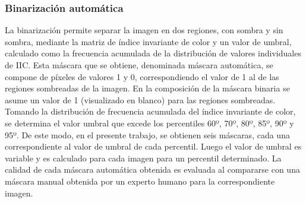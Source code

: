 \subsubsection{Binarización automática}
 La binarización permite separar la imagen en dos regiones, con sombra y sin sombra, mediante la matriz de índice invariante de color y un valor de umbral, calculado como la frecuencia acumulada de la distribución de valores individuales de IIC. Esta máscara que se obtiene, denominada máscara automática, se compone de píxeles de valores 1 y 0, correspondiendo el valor de 1 al de las regiones sombreadas de la imagen. En la composición de la máscara binaria se asume un valor de 1 (visualizado en blanco) para las regiones sombreadas. Tomando la distribución de frecuencia acumulada del índice invariante de color, se determina el valor umbral que excede los percentiles 60º, 70º, 80º, 85º, 90º y 95º. De este modo, en el presente trabajo, se obtienen seis máscaras, cada una correspondiente al valor de umbral de cada percentil. Luego el valor de umbral es variable y es calculado para cada imagen para un percentil determinado. La calidad de cada máscara automática obtenida es evaluada al compararse con una máscara manual obtenida por un experto humano para la correspondiente imagen.

